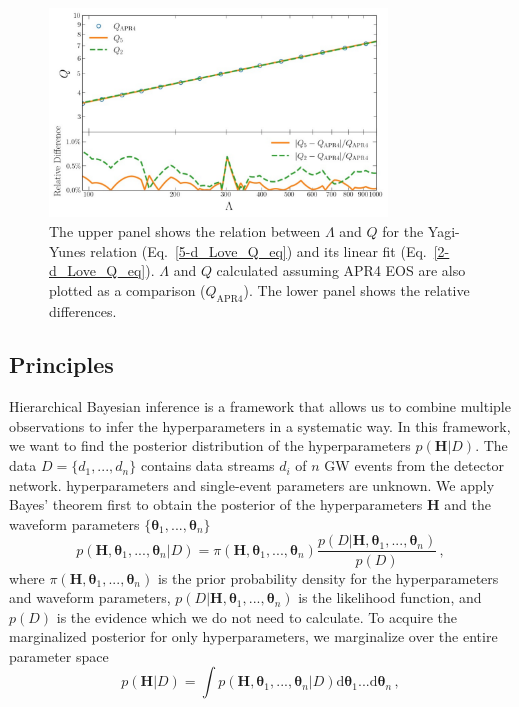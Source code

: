 \documentclass[a4paper,11pt]{article}
\begin{document}
\begin{figure}[tbp]
\centering
\includegraphics[width=0.8\textwidth]{2d-5d difference.pdf}%
\caption{\label{relative_difference} The upper panel shows the relation between 
$\Lambda$ and $Q$ for the Yagi-Yunes relation (Eq.~\eqref{5-d_Love_Q_eq}) and its 
linear fit (Eq.~\eqref{2-d_Love_Q_eq}). $\Lambda$ and $Q$ calculated assuming APR4 
EOS are also plotted as a comparison ($Q_{\mathrm{APR4}}$). The lower panel shows 
the relative differences.}
\end{figure}

\subsection{Principles}
\label{subsec:framework_principles}

Hierarchical Bayesian inference is a framework that allows us to combine multiple 
observations to infer the hyperparameters in a systematic way. In this framework, 
we want to find the posterior distribution of the hyperparameters $p(\bm{H}|D)$. 
The data $D=\{d_1,...,d_n\}$ contains data streams $d_i$ of $n$ GW events from the 
detector network. hyperparameters and single-event parameters are unknown. We 
apply Bayes' theorem first to obtain the posterior of the hyperparameters $\bm{H}$ 
and the waveform parameters $\{\bm{\theta}_1,...,\bm{\theta}_n\}$
\begin{equation}
\label{bayes2}
p(\bm{H},\bm{\theta}_1,...,\bm{\theta}_n|D)=\pi(\bm{H},\bm{\theta}_1,...,\bm{\theta}_n)\frac{p(D|\bm{H},\bm{\theta}_1,...,\bm{\theta}_n)}{p(D)}\,,
\end{equation}
where $\pi(\bm{H},\bm{\theta}_1,...,\bm{\theta}_n)$ is the prior probability 
density for the hyperparameters and waveform parameters, $p(D|\bm{H},\bm{\theta}_1,...,\bm{\theta}_n)$ 
is the likelihood function, and $p(D)$ is the evidence which we do not need to 
calculate. To acquire the marginalized posterior for only hyperparameters, we 
marginalize over the entire parameter space
\begin{equation}
\label{bayes1}
p(\bm{H}|D) = \int p(\bm{H},\bm{\theta}_1,...,\bm{\theta}_n|D) \text{d}\bm{\theta}_1...\text{d}\bm{\theta}_n\,,
\end{equation}
\end{document}
